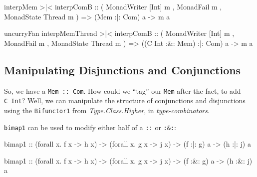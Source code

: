 \documentclass[]{article}
\newenvironment{Shaded}{}{}
\newcommand{\DataTypeTok}[1]{\textcolor[rgb]{0.56,0.13,0.00}{#1}}
\newcommand{\FunctionTok}[1]{\textcolor[rgb]{0.02,0.16,0.49}{#1}}
\newcommand{\NormalTok}[1]{#1}
\newcommand{\OtherTok}[1]{\textcolor[rgb]{0.00,0.44,0.13}{#1}}
\begin{document}
\begin{Shaded}
\begin{Highlighting}[]
\NormalTok{interpMem }\FunctionTok{>|<}\NormalTok{ interpComB}
\OtherTok{    ::}\NormalTok{ ( }\DataTypeTok{MonadWriter}\NormalTok{ [}\DataTypeTok{Int}\NormalTok{] m}
\NormalTok{       , }\DataTypeTok{MonadFail}\NormalTok{ m}
\NormalTok{       , }\DataTypeTok{MonadState} \DataTypeTok{Thread}\NormalTok{ m}
\NormalTok{       )}
    \OtherTok{=>}\NormalTok{ (}\DataTypeTok{Mem} \FunctionTok{:|:} \DataTypeTok{Com}\NormalTok{) a}
    \OtherTok{->}\NormalTok{ m a}

\NormalTok{uncurryFan interpMemThread }\FunctionTok{>|<}\NormalTok{ interpComB}
\OtherTok{    ::}\NormalTok{ ( }\DataTypeTok{MonadWriter}\NormalTok{ [}\DataTypeTok{Int}\NormalTok{] m}
\NormalTok{       , }\DataTypeTok{MonadFail}\NormalTok{ m}
\NormalTok{       , }\DataTypeTok{MonadState} \DataTypeTok{Thread}\NormalTok{ m}
\NormalTok{       )}
    \OtherTok{=>}\NormalTok{ ((}\DataTypeTok{C} \DataTypeTok{Int} \FunctionTok{:&:} \DataTypeTok{Mem}\NormalTok{) }\FunctionTok{:|:} \DataTypeTok{Com}\NormalTok{) a}
    \OtherTok{->}\NormalTok{ m a}
\end{Highlighting}
\end{Shaded}

\hypertarget{manipulating-disjunctions-and-conjunctions}{%
\subsection{Manipulating Disjunctions and
Conjunctions}\label{manipulating-disjunctions-and-conjunctions}}

So, we have a \texttt{Mem\ :\textbar{}:\ Com}. How could we ``tag'' our
\texttt{Mem} after-the-fact, to add \texttt{C\ Int}? Well, we can manipulate the
structure of conjunctions and disjunctions using the \texttt{Bifunctor1} from
\emph{Type.Class.Higher}, in \emph{type-combinators}.

\texttt{bimap1} can be used to modify either half of a \texttt{:\textbar{}:} or
\texttt{:\&:}:

\begin{Shaded}
\begin{Highlighting}[]
\NormalTok{bimap1}
\OtherTok{    ::}\NormalTok{ (forall x}\FunctionTok{.}\NormalTok{ f x }\OtherTok{->}\NormalTok{ h x)}
    \OtherTok{->}\NormalTok{ (forall x}\FunctionTok{.}\NormalTok{ g x }\OtherTok{->}\NormalTok{ j x)}
    \OtherTok{->}\NormalTok{ (f }\FunctionTok{:|:}\NormalTok{ g) a}
    \OtherTok{->}\NormalTok{ (h }\FunctionTok{:|:}\NormalTok{ j) a}

\NormalTok{bimap1}
\OtherTok{    ::}\NormalTok{ (forall x}\FunctionTok{.}\NormalTok{ f x }\OtherTok{->}\NormalTok{ h x)}
    \OtherTok{->}\NormalTok{ (forall x}\FunctionTok{.}\NormalTok{ g x }\OtherTok{->}\NormalTok{ j x)}
    \OtherTok{->}\NormalTok{ (f }\FunctionTok{:&:}\NormalTok{ g) a}
    \OtherTok{->}\NormalTok{ (h }\FunctionTok{:&:}\NormalTok{ j) a}
\end{Highlighting}
\end{Shaded}
\end{document}
